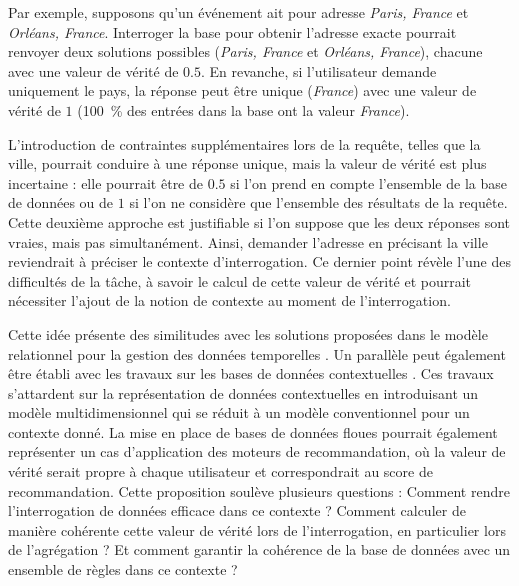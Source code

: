 \begin{example}
    Par exemple, supposons qu'un événement ait pour adresse \emph{Paris, France} et \emph{Orléans, France}.
    Interroger la base pour obtenir l'adresse exacte pourrait renvoyer deux solutions possibles (\emph{Paris, France} et \emph{Orléans, France}), chacune avec une valeur de vérité de $0.5$.
    En revanche, si l'utilisateur demande uniquement le pays, la réponse peut être unique (\emph{France}) avec une valeur de vérité de $1$ (\SI{100}{\percent} des entrées dans la base ont la valeur \emph{France}).

    L'introduction de contraintes supplémentaires lors de la requête, telles que la ville, pourrait conduire à une réponse unique, mais la valeur de vérité est plus incertaine : elle pourrait être de $0.5$ si l'on prend en compte l'ensemble de la base de données ou de $1$ si l'on ne considère que l'ensemble des résultats de la requête.
    Cette deuxième approche est justifiable si l'on suppose que les deux réponses sont vraies, mais pas simultanément.
    Ainsi, demander l'adresse en précisant la ville reviendrait à préciser le contexte d'interrogation.
    Ce dernier point révèle l'une des difficultés de la tâche, à savoir le calcul de cette valeur de vérité et pourrait nécessiter l'ajout de la notion de contexte au moment de l'interrogation.
\end{example}

Cette idée présente des similitudes avec les solutions proposées dans le modèle relationnel pour la gestion des données temporelles \cite{kulkarniTemporalFeaturesSQL2012}.
Un parallèle peut également être établi avec les travaux sur les bases de données contextuelles \cite{stavrakasMultidimensionalSemistructuredData2002,stavrakasMultidimensionalSemistructuredData2003}.
Ces travaux s'attardent sur la représentation de données contextuelles en introduisant un modèle multidimensionnel qui se réduit à un modèle conventionnel pour un contexte donné.
La mise en place de bases de données floues pourrait également représenter un cas d'application des moteurs de recommandation, où la valeur de vérité serait propre à chaque utilisateur et correspondrait au score de recommandation.
Cette proposition soulève plusieurs questions : Comment rendre l'interrogation de données efficace dans ce contexte ? Comment calculer de manière cohérente cette valeur de vérité lors de l'interrogation, en particulier lors de l'agrégation ? Et comment garantir la cohérence de la base de données avec un ensemble de règles dans ce contexte ?
